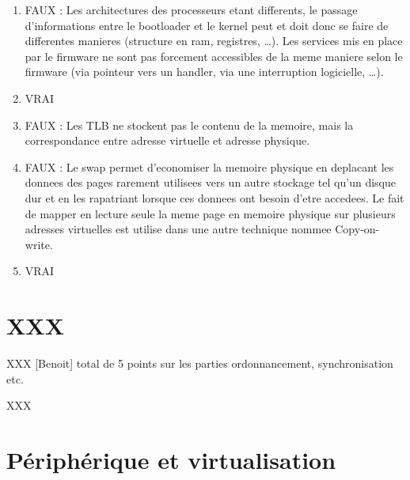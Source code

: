 \begin{correction}

\begin{enumerate}

\item FAUX : Les architectures des processeurs etant differents, le passage d'informations entre le bootloader et le kernel peut et doit donc se faire de differentes manieres (structure en ram, registres, \ldots). Les services mis en place par le firmware ne sont pas forcement accessibles de la meme maniere selon le firmware (via pointeur vers un handler, via une interruption logicielle, \ldots).

\item VRAI

\item FAUX : Les TLB ne stockent pas le contenu de la memoire, mais la correspondance entre adresse virtuelle et adresse physique.

\item FAUX : Le swap permet d'economiser la memoire physique en deplacant les donnees des pages rarement utilisees vers un autre stockage tel qu'un disque dur et en les rapatriant lorsque ces donnees ont besoin d'etre accedees. Le fait de mapper en lecture seule la meme page en memoire physique sur plusieurs adresses virtuelles est utilise dans une autre technique nommee Copy-on-write.

\item VRAI

\end{enumerate}

\end{correction}

%
%

\section{XXX
         {\hfill{} }}

XXX [Benoit] total de 5 points sur les parties ordonnancement, synchronisation
             etc.

\begin{correction}

XXX

\end{correction}

%
%

\section{P\'eriph\'erique et virtualisation
         }

